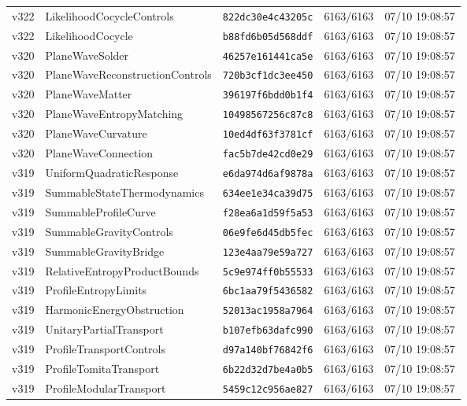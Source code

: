 \documentclass[11pt]{article}
\theoremstyle{definition}\newtheorem{deriv}{Derivation}
\begin{document}
{\begin{longtable}{@{}lllll@{}}
v322 & LikelihoodCocycleControls & \texttt{822dc30e4c43205c} & 6163/6163 & 07/10 19:08:57 \\
v322 & LikelihoodCocycle & \texttt{b88fd6b05d568ddf} & 6163/6163 & 07/10 19:08:57 \\
v320 & PlaneWaveSolder & \texttt{46257e161441ca5e} & 6163/6163 & 07/10 19:08:57 \\
v320 & PlaneWaveReconstructionControls & \texttt{720b3cf1dc3ee450} & 6163/6163 & 07/10 19:08:57 \\
v320 & PlaneWaveMatter & \texttt{396197f6bdd0b1f4} & 6163/6163 & 07/10 19:08:57 \\
v320 & PlaneWaveEntropyMatching & \texttt{10498567256c87c8} & 6163/6163 & 07/10 19:08:57 \\
v320 & PlaneWaveCurvature & \texttt{10ed4df63f3781cf} & 6163/6163 & 07/10 19:08:57 \\
v320 & PlaneWaveConnection & \texttt{fac5b7de42cd0e29} & 6163/6163 & 07/10 19:08:57 \\
v319 & UniformQuadraticResponse & \texttt{e6da974d6af9878a} & 6163/6163 & 07/10 19:08:57 \\
v319 & SummableStateThermodynamics & \texttt{634ee1e34ca39d75} & 6163/6163 & 07/10 19:08:57 \\
v319 & SummableProfileCurve & \texttt{f28ea6a1d59f5a53} & 6163/6163 & 07/10 19:08:57 \\
v319 & SummableGravityControls & \texttt{06e9fe6d45db5fec} & 6163/6163 & 07/10 19:08:57 \\
v319 & SummableGravityBridge & \texttt{123e4aa79e59a727} & 6163/6163 & 07/10 19:08:57 \\
v319 & RelativeEntropyProductBounds & \texttt{5c9e974ff0b55533} & 6163/6163 & 07/10 19:08:57 \\
v319 & ProfileEntropyLimits & \texttt{6bc1aa79f5436582} & 6163/6163 & 07/10 19:08:57 \\
v319 & HarmonicEnergyObstruction & \texttt{52013ac1958a7964} & 6163/6163 & 07/10 19:08:57 \\
v319 & UnitaryPartialTransport & \texttt{b107efb63dafc990} & 6163/6163 & 07/10 19:08:57 \\
v319 & ProfileTransportControls & \texttt{d97a140bf76842f6} & 6163/6163 & 07/10 19:08:57 \\
v319 & ProfileTomitaTransport & \texttt{6b22d32d7be4a0b5} & 6163/6163 & 07/10 19:08:57 \\
v319 & ProfileModularTransport & \texttt{5459c12c956ae827} & 6163/6163 & 07/10 19:08:57 \\

\end{longtable}}
\end{document}
